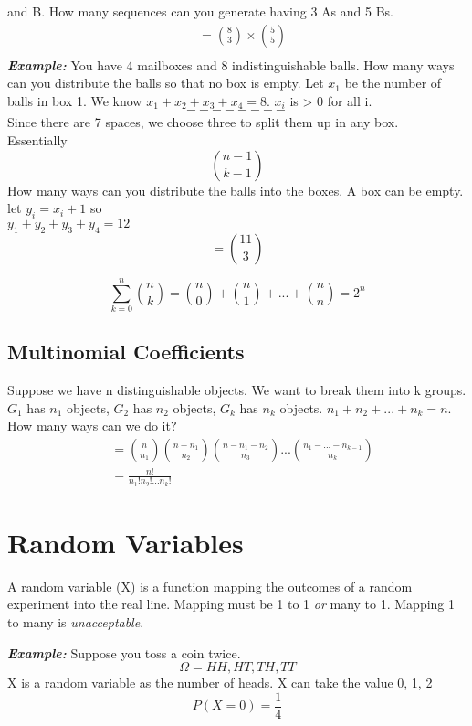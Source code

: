 \documentclass[12pt]{article}
\begin{document}
    and B. How many sequences can you generate having 
    3 As and 5 Bs. 
    \begin{align*}
        &=\binom{8}{3} \times \binom{5}{5}\\
    \end{align*}
    \textit{\textbf{Example:}} You have 4 mailboxes and 8 
    indistinguishable balls. How many ways can you distribute
    the balls so that no box is empty. Let $x_1$ be the number of
    balls in box 1. We know $x_1+x_2+x_3+x_4 = 8$. $x_i$ is > 0 
    for all i. 
    $$- - - - - - - -$$
    Since there are 7 spaces, we choose three to split them up 
    in any box.\\
    Essentially
    $$\binom{n-1}{k-1}$$
    How many ways can you distribute the balls into the boxes. 
    A box can be empty.\\
    let $y_i = x_i + 1$ so\\
    $y_1+y_2+y_3+y_4 = 12$
    $$=\binom{11}{3}$$

    $$\sum_{k=0}^{n}\binom{n}{k} = \binom{n}{0} + \binom{n}{1} + ... + \binom{n}{n} = 2^n$$

    \subsection{Multinomial Coefficients}

    Suppose we have n distinguishable objects. We want to break them 
    into k groups. $G_1$ has $n_1$ objects, $G_2$ has $n_2$ objects,
    $G_k$ has $n_k$ objects. $n_1 + n_2 + ... + n_k = n$. How many ways
    can we do it?
    \begin{align*}
        &=\binom{n}{n_1}\binom{n-n_1}{n_2}\binom{n-n_1-n_2}{n_3}...\binom{n_1-...-n_{k-1}}{n_k}\\
        &= \frac{n!}{n_1!n_2!...n_k!}
    \end{align*}

    \section{Random Variables}

    A random variable (X) is a function mapping the outcomes of a random
    experiment into the real line. Mapping must be 1 to 1 \textit{or} many to 1.
    Mapping 1 to many is \textit{unacceptable}.

    \textit{\textbf{Example:}} Suppose you toss a coin twice. 
    $$\Omega = {HH, HT, TH, TT}$$
    X is a random variable as the number of heads. X can take the 
    value 0, 1, 2\\
    $$P(X=0) = \frac{1}{4}$$
\end{document}
